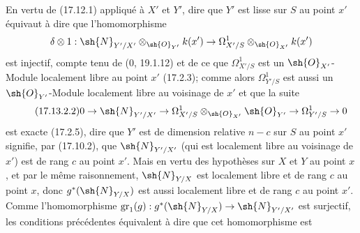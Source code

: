 En vertu de (17.12.1) appliqué à $X'$ et $Y'$, dire que $Y'$ est lisse sur $S$ au point $x'$ équivaut à dire que l'homomorphisme
\[
\delta\otimes1:\sh{N}_{Y'/X'}\otimes_{\sh{O}_{Y'}}k(x')\to\Omega^1_{X'/S}\otimes_{\sh{O}_{X'}}k(x')
\]
est injectif, compte tenu de (0, 19.1.12) et de ce que $\Omega^1_{X'/S}$ est un $\sh{O}_{X'}$-Module localement libre au point $x'$ (17.2.3); comme alors $\Omega^1_{Y'/S}$ est aussi un $\sh{O}_{Y'}$-Module localement libre au voisinage de $x'$ et que la suite
\[
\label{IV.17.13.2.2}
\tag{17.13.2.2}
0\to\sh{N}_{Y'/X'}\to\Omega^1_{X'/S}\otimes_{\sh{O}_{X'}}\sh{O}_{Y'}\to\Omega^1_{Y'/S}\to0
\]
est exacte (17.2.5), dire que $Y'$ est de dimension relative $n-c$ sur $S$ au point $x'$ signifie, par (17.10.2), que $\sh{N}_{Y'/X'}$ (qui est localement libre au voisinage de $x'$) est de rang $c$ au point $x'$. Mais en vertu des hypothèses sur $X$ et $Y$ au point $x$, et par le même raisonnement, $\sh{N}_{Y/X}$ est localement libre et de rang $c$ au point $x$, donc $g^*(\sh{N}_{Y/X})$ est aussi localement libre et de rang $c$ au point $x'$. Comme l'homomorphisme $\operatorname{gr}_1(g):g^*(\sh{N}_{Y/X})\to\sh{N}_{Y'/X'}$ est surjectif, les conditions précédentes équivalent à dire que cet homomorphisme est

